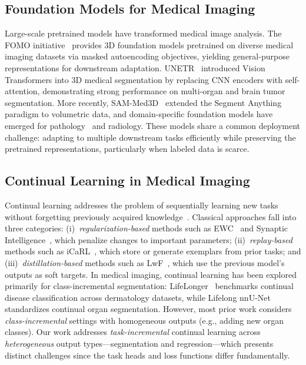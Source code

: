 \documentclass[journal,twoside,web]{ieeecolor}
\begin{document}
\subsection{Foundation Models for Medical Imaging}

Large-scale pretrained models have transformed medical image analysis. The FOMO initiative~\cite{fomo2025} provides 3D foundation models pretrained on diverse medical imaging datasets via masked autoencoding objectives, yielding general-purpose representations for downstream adaptation. UNETR~\cite{unetr} introduced Vision Transformers into 3D medical segmentation by replacing CNN encoders with self-attention, demonstrating strong performance on multi-organ and brain tumor segmentation. More recently, SAM-Med3D~\cite{sammed3d} extended the Segment Anything paradigm to volumetric data, and domain-specific foundation models have emerged for pathology~\cite{chen2024towards} and radiology. These models share a common deployment challenge: adapting to multiple downstream tasks efficiently while preserving the pretrained representations, particularly when labeled data is scarce.

\subsection{Continual Learning in Medical Imaging}

Continual learning addresses the problem of sequentially learning new tasks without forgetting previously acquired knowledge~\cite{mccloskey1989catastrophic}. Classical approaches fall into three categories: (i)~\emph{regularization-based} methods such as EWC~\cite{kirkpatrick2017} and Synaptic Intelligence~\cite{zenke2017continual}, which penalize changes to important parameters; (ii)~\emph{replay-based} methods such as iCaRL~\cite{rebuffi2017icarl}, which store or generate exemplars from prior tasks; and (iii)~\emph{distillation-based} methods such as LwF~\cite{li2017lwf}, which use the previous model's outputs as soft targets. In medical imaging, continual learning has been explored primarily for class-incremental segmentation: LifeLonger~\cite{derakhshani2022lifelonger} benchmarks continual disease classification across dermatology datasets, while Lifelong nnU-Net~\cite{gonzalez2023lifelong} standardizes continual organ segmentation. However, most prior work considers \emph{class-incremental} settings with homogeneous outputs (e.g., adding new organ classes). Our work addresses \emph{task-incremental} continual learning across \emph{heterogeneous} output types---segmentation and regression---which presents distinct challenges since the task heads and loss functions differ fundamentally.
\end{document}

